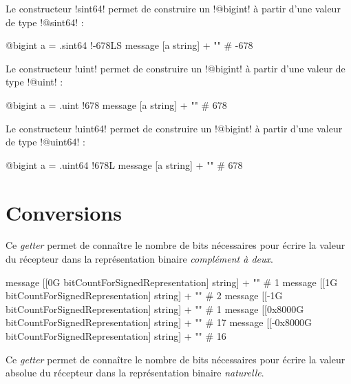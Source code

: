 Le constructeur \ggs!sint64! permet de construire un \ggs!@bigint! à partir d'une valeur de type \ggs!@sint64! :
\begin{galgas}
@bigint a = .sint64 {!-678LS}
message [a string] + "\n" # -678
\end{galgas}





Le constructeur \ggs!uint! permet de construire un \ggs!@bigint! à partir d'une valeur de type \ggs!@uint! :
\begin{galgas}
@bigint a = .uint {!678}
message [a string] + "\n" # 678
\end{galgas}





Le constructeur \ggs!uint64! permet de construire un \ggs!@bigint! à partir d'une valeur de type \ggs!@uint64! :
\begin{galgas}
@bigint a = .uint64 {!678L}
message [a string] + "\n" # 678
\end{galgas}










\section{Conversions}


Ce \emph{getter} permet de connaître le nombre de bits nécessaires pour écrire la valeur du récepteur dans la représentation binaire \emph{complément à deux}.

\begin{galgas}
message [[0G bitCountForSignedRepresentation] string] + "\n" # 1
message [[1G bitCountForSignedRepresentation] string] + "\n" # 2
message [[-1G bitCountForSignedRepresentation] string] + "\n" # 1
message [[0x8000G bitCountForSignedRepresentation] string] + "\n" # 17
message [[-0x8000G bitCountForSignedRepresentation] string] + "\n" # 16
\end{galgas}




Ce \emph{getter} permet de connaître le nombre de bits nécessaires pour écrire la valeur absolue du récepteur dans la représentation binaire \emph{naturelle}. 

